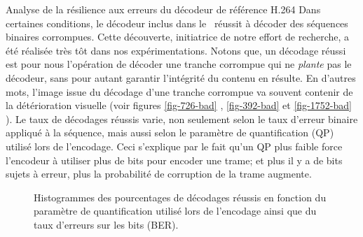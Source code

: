 \begin{section}{Analyse de la résilience aux erreurs du décodeur de référence H.264}
\label{sec-ResilienceDecodeur}
Dans certaines conditions, le décodeur inclus dans le \ltCodec~réussit à décoder
des séquences binaires corrompues. Cette découverte, initiatrice de notre effort
de recherche, a été réalisée très tôt dans nos expérimentations. Notons que, un
décodage réussi est pour nous l'opération de décoder une tranche corrompue qui
ne \textit{plante} pas le décodeur, sans pour autant garantir l'intégrité du
contenu en résulte. En d'autres mots, l'image issue du décodage d'une tranche
corrompue va souvent contenir de la détérioration visuelle (voir figures
\ref{fig-726-bad} , \ref{fig-392-bad}  et
\ref{fig-1752-bad} ). Le taux de décodages réussis varie, non
seulement selon le taux d'erreur binaire appliqué à la séquence, mais aussi
selon le paramètre de quantification (QP) utilisé lors de l'encodage. Ceci
s'explique par le fait qu'un QP plus faible force l'encodeur à utiliser plus de
bits pour encoder une trame; et plus il y a de bits sujets à erreur, plus la
probabilité de corruption de la trame augmente.

\begin{figure}
	\caption[Histogrammes des pourcentages de décodages réussis]{Histogrammes des
pourcentages de décodages réussis en fonction du paramètre de quantification
utilisé lors de l'encodage ainsi que du taux d'erreurs sur les bits (BER).}
	\label{fig-Decodings}
\end{figure}


\end{section}
